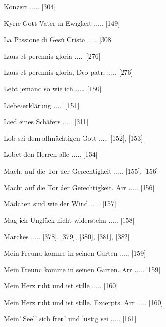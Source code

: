 \documentclass[twocolumn]{book}
\begin{document}
\newline 
Konzert ..... [304]

\newline 
Kyrie Gott Vater in Ewigkeit ..... [149]

\newline 
La Passione di Gesù Cristo ..... [308]

\newline 
Laus et perennis gloria ..... [276]

\newline 
Laus et perennis gloria, Deo patri ..... [276]

\newline 
Lebt jemand so wie ich ..... [150]

\newline 
Liebeserklärung ..... [151]

\newline 
Lied eines Schäfers ..... [311]

\newline 
Lob sei dem allmächtigen Gott ..... [152], [153]

\newline 
Lobet den Herren alle ..... [154]

\newline 
Macht auf die Tor der Gerechtigkeit ..... [155], [156]

\newline 
Macht auf die Tor der Gerechtigkeit. Arr ..... [156]

\newline 
Mädchen sind wie der Wind ..... [157]

\newline 
Mag ich Unglück nicht widerstehn ..... [158]

\newline 
Marches ..... [378], [379], [380], [381], [382]

\newline 
Mein Freund komme in seinen Garten ..... [159]

\newline 
Mein Freund komme in seinen Garten. Arr ..... [159]

\newline 
Mein Herz ruht und ist stille ..... [160]

\newline 
Mein Herz ruht und ist stille. Excerpts. Arr ..... [160]

\newline 
Mein' Seel' sich freu' und lustig sei ..... [161]
\end{document}
